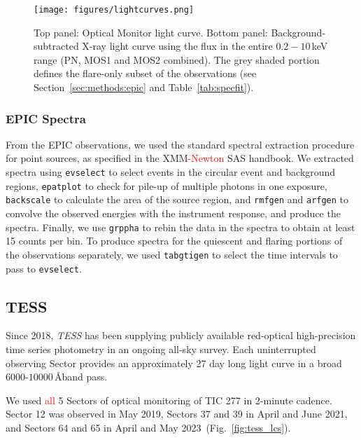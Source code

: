 \documentclass[twocolumn]{aastex631}
\begin{document}
\begin{figure*}[ht!]
    \begin{centering}
        \texttt{[image: figures/lightcurves.png]}
        \caption{
         Top panel: Optical Monitor light curve. Bottom panel: Background-subtracted X-ray light curve using the flux in the entire $0.2-10\,$keV range  (PN, MOS1 and MOS2 combined). The grey shaded portion defines the flare-only subset of the observations (see Section~\ref{sec:methods:epic} and Table~\ref{tab:specfit}).
        }
        \label{fig:lightcurves}
    \end{centering}
\end{figure*}


\subsubsection{EPIC Spectra}
From the EPIC observations, we used the standard spectral extraction procedure for point sources, as specified in the XMM\textcolor{red}{-Newton} SAS handbook. We extracted spectra using \texttt{evselect} to select events in the circular event and background regions, \texttt{epatplot} to check for pile-up of multiple photons in one exposure, \texttt{backscale} to calculate the area of the source region, and \texttt{rmfgen} and \texttt{arfgen} to convolve the observed energies with the instrument response, and produce the spectra. Finally, we use \texttt{grppha} to rebin the data in the spectra to obtain at least 15 counts per bin. To produce spectra for the quiescent and flaring portions of the observations separately, we used \texttt{tabgtigen} to select the time intervals to pass to \texttt{evselect}.

\subsection{TESS}
\label{sec:obs:tess}
Since 2018, \textit{TESS} has been supplying publicly available red-optical high-precision time series photometry in an ongoing all-sky survey. Each uninterrupted observing Sector provides an approximately 27 day long light curve in a broad $6000$-$10000\,$\AA band pass. 

We used \textcolor{red}{all} 5 Sectors of optical monitoring of TIC 277 in 2-minute cadence. Sector 12 was observed in May 2019, Sectors 37 and 39 in April and June 2021, and Sectors 64 and 65 in April and May 2023~(Fig.~\ref{fig:tess_lcs}). 
\end{document}
